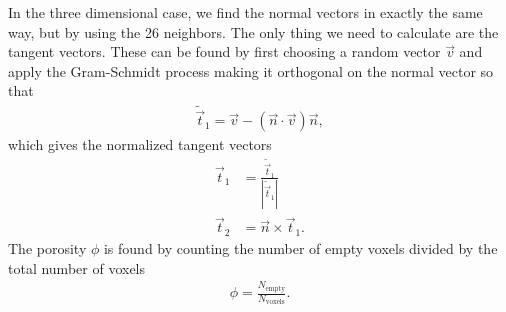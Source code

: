 In the three dimensional case, we find the normal vectors in exactly the same way, but by using the 26 neighbors. The only thing we need to calculate are the tangent vectors. These can be found by first choosing a random vector $\vec v$ and apply the Gram-Schmidt process making it orthogonal on the normal vector so that
\begin{align}
	\tilde{\vec t}_1 = \vec v - (\vec n\cdot \vec v)\vec n,
\end{align}
which gives the normalized tangent vectors
\begin{align}
	\vec t_1 &= \frac{ \tilde{\vec t}_1}{|\tilde{\vec t}_1|}\\
	\vec t_2 &= \vec n\times \vec t_1.
\end{align}
The porosity $\phi$ is found by counting the number of empty voxels divided by the total number of voxels
\begin{align}
	\label{eq:dsmc_geometry_porosity}
	\phi = \frac{N_\text{empty}}{N_\text{voxels}}.
\end{align}